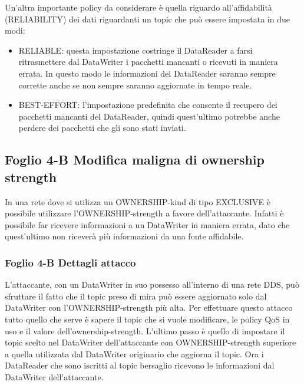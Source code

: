 

Un'altra importante policy da considerare è quella riguardo all'affidabilità 
(RELIABILITY) dei dati riguardanti un topic che può essere impostata in due
modi:
\begin{itemize}
    \item RELIABLE: questa impostazione costringe il DataReader a farsi
    ritrasmettere dal DataWriter i pacchetti mancanti o ricevuti in maniera errata.
    In questo modo le informazioni del DataReader saranno sempre corrette anche
    se non sempre saranno aggiornate in tempo reale.
    \item BEST-EFFORT: l'impostazione predefinita che consente il recupero
    dei pacchetti mancanti del DataReader, quindi quest'ultimo potrebbe anche
    perdere dei pacchetti che gli sono stati inviati.
\end{itemize}




\subsection{Foglio 4-B Modifica maligna di ownership strength}
In una rete dove si utilizza un OWNERSHIP-kind di tipo EXCLUSIVE è possibile
utilizzare l'OWNERSHIP-strength a favore
dell'attaccante. Infatti è possibile far ricevere informazioni a un DataWriter
in maniera errata, dato che quest'ultimo non riceverà più informazioni da
una fonte affidabile.

\subsubsection{Foglio 4-B Dettagli attacco}
L'attaccante, con un DataWriter in suo possesso all'interno di una rete DDS,
può sfruttare il fatto che il topic preso di mira può essere aggiornato
solo dal DataWriter con l'OWNERSHIP-strength più alta. 
Per effettuare questo attacco tutto quello che serve è sapere il topic che
si vuole modificare, le policy QoS in uso e il valore dell'ownership-strength.
L'ultimo passo è quello di impostare il topic scelto nel DataWriter
dell'attaccante con OWNERSHIP-strength superiore a quella utilizzata dal
DataWriter originario che aggiorna il topic.
Ora i DataReader che sono iscritti al topic bersaglio
ricevono le informazioni dal DataWriter dell'attaccante.


